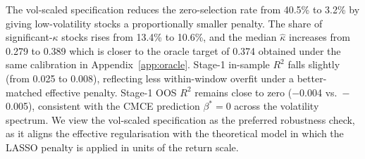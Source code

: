 The vol-scaled specification reduces the zero-selection rate from 40.5\% to 3.2\%
by giving low-volatility stocks a proportionally smaller penalty.
The share of significant-$\kappa$ stocks rises from 13.4\% to 10.6\%, and the median
$\hat\kappa$ increases from 0.279 to 0.389 which is closer to the oracle target of 0.374
obtained under the same calibration in Appendix~\ref{app:oracle}.
Stage-1 in-sample $R^2$ falls slightly (from 0.025 to 0.008), reflecting less
within-window overfit under a better-matched effective penalty.
Stage-1 OOS $R^2$ remains close to zero ($-$0.004 vs.\ $-$0.005), consistent with
the CMCE prediction $\beta^*=0$ across the volatility spectrum.
We view the vol-scaled specification as the preferred robustness check, as it
aligns the effective regularisation with the theoretical model in which the
LASSO penalty is applied in units of the return scale.


